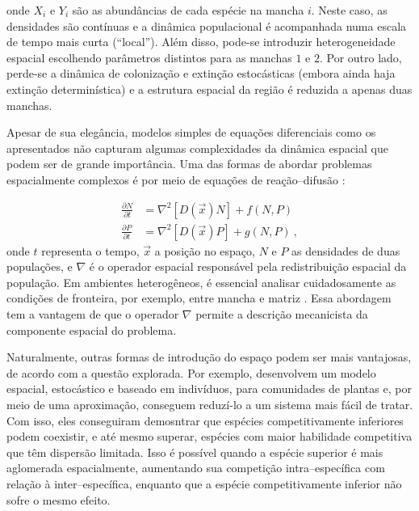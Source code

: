 \documentclass[12pt]{extarticle}
\begin{document}
onde $X_i$ e $Y_i$ são as abundâncias de cada espécie na mancha $i$. Neste
caso, as densidades são contínuas e a dinâmica populacional é acompanhada numa
escala de tempo mais curta (``local''). Além disso, pode-se introduzir
heterogeneidade espacial escolhendo parâmetros distintos para as manchas $1$ e
$2$. Por outro lado, perde-se a dinâmica de colonização e extinção
estocásticas (embora ainda haja extinção determinística) e a estrutura
espacial da região é reduzida a apenas duas manchas.

Apesar de sua elegância, modelos simples de equações diferenciais como os
apresentados não capturam algumas complexidades da dinâmica espacial que podem
ser de grande importância. Uma das formas de abordar problemas espacialmente
complexos é por meio de equações de reação--difusão \citep{murray2002}:

\begin{equation}
  \begin{aligned}
    \frac{\partial N}{\partial t} &= \nabla^2 \left[ D(\vec{x})N \right] + f(N,P)\\
    \frac{\partial P}{\partial t} &= \nabla^2 \left[ D(\vec{x})P \right] + g(N,P)~,
  \end{aligned}
\end{equation}
%
onde $t$ representa o tempo, $\vec{x}$ a posição no espaço, $N$ e $P$ as
densidades de duas populações, e $\nabla$ é o operador espacial responsável
pela redistribuição espacial da população. Em ambientes heterogêneos, é
essencial analisar cuidadosamente as condições de fronteira, por exemplo,
entre mancha e matriz \citep{turchin1998, ovaskainen2003}. Essa abordagem tem
a vantagem de que o operador $\nabla$ permite a descrição mecanicista da componente
espacial do problema.

Naturalmente, outras formas de introdução do espaço podem ser mais vantajosas,
de acordo com a questão explorada. Por exemplo, \citet{law2000} desenvolvem um
modelo espacial, estocástico e baseado em indivíduos, para comunidades de
plantas e, por meio de uma aproximação, conseguem reduzí-lo a um sistema mais
fácil de tratar. 
Com isso, eles conseguiram demosntrar que 
espécies competitivamente inferiores podem
coexistir, e até mesmo superar, 
espécies com maior habilidade competitiva que
têm dispersão limitada. Isso é possível quando a espécie superior é mais
aglomerada espacialmente, aumentando sua competição intra--específica com
relação à inter--específica, enquanto que a espécie competitivamente inferior
não sofre o mesmo efeito.
\end{document}

